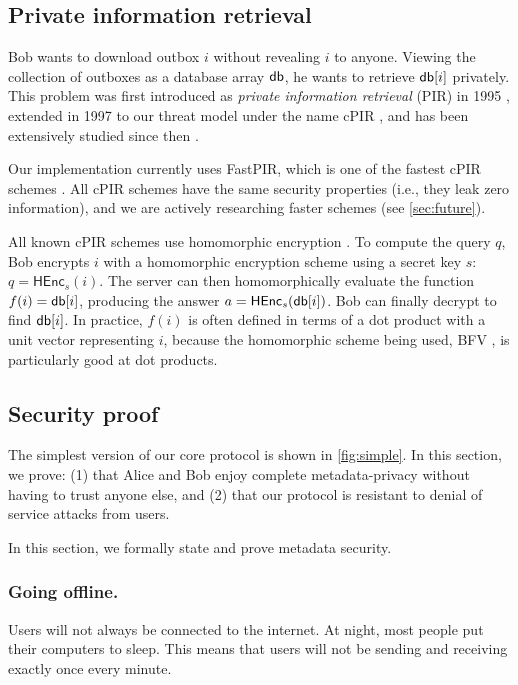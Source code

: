 \subsection{Private information retrieval}

Bob wants to download outbox $i$ without revealing $i$ to anyone. Viewing the collection of outboxes as a database array $\mathsf{db}$, he wants to retrieve $\mathsf{db}[i]$ privately. This problem was first introduced as \textit{private information retrieval} (PIR) in 1995 \cite{chor1995private}, extended in 1997 to our threat model under the name cPIR \cite{kushilevitz1997replication}, and has been extensively studied since then \cite{melchor2016xpir,angel2018pir, ahmad2021addra}.

Our implementation currently uses FastPIR, which is one of the fastest cPIR schemes \cite{ahmad2021addra}. All cPIR schemes have the same security properties (i.e., they leak zero information), and we are actively researching faster schemes (see \cref{sec:future}).

All known cPIR schemes use homomorphic encryption \cite{gentry2010computing}. To compute the query $q$, Bob encrypts $i$ with a homomorphic encryption scheme using a secret key $s$: $q = \mathsf{HEnc}_s(i)$. The server can then homomorphically evaluate the function $f(i) = \mathsf{db}[i]$, producing the answer $a = \mathsf{HEnc}_s(\mathsf{db}[i])$. Bob can finally decrypt to find $\mathsf{db}[i]$. In practice, $f(i)$ is often defined in terms of a dot product with a unit vector representing $i$, because the homomorphic scheme being used, BFV \cite{fan2012somewhat}, is particularly good at dot products.

\subsection{Security proof}

The simplest version of our core protocol is shown in \cref{fig:simple}. In this section, we prove: (1) that Alice and Bob enjoy complete metadata-privacy without having to trust anyone else, and (2) that our protocol is resistant to denial of service attacks from users.

In this section, we formally state and prove metadata security.


\subsubsection{Going offline.} Users will not always be connected to the internet. At night, most people put their computers to sleep. This means that users will not be sending and receiving exactly once every minute. 

